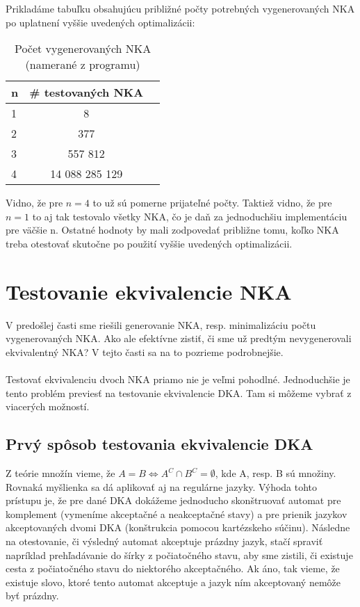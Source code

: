 Prikladáme tabuľku obsahujúcu približné počty potrebných vygenerovaných NKA po uplatnení vyššie uvedených optimalizácii:

\begin{table}[h]
  \centering
  \begin{tabular}{|l|c|r|}
    \hline
    n & \# testovaných NKA \\
    \hline
    1 & 8 \\ 
    \hline
    2 & 377 \\ 
    \hline
    3 & 557 812 \\
    \hline
    4 & 14 088 285 129 \\
    \hline
  \end{tabular}
  
  \caption{Počet vygenerovaných NKA (namerané z programu)}
  
  \label{tab:pocVsNKA}
\end{table}
Vidno, že pre $n=4$ to už sú pomerne prijateľné počty. Taktiež vidno, že pre $n=1$ to aj tak testovalo všetky NKA, čo je daň za jednoduchšiu implementáciu pre väčšie n. Ostatné hodnoty by mali zodpovedať približne tomu, koľko NKA treba otestovať skutočne po použití vyššie uvedených optimalizácii.

\section{Testovanie ekvivalencie NKA}
V predošlej časti sme riešili generovanie NKA, resp. minimalizáciu počtu vygenerovaných NKA. Ako ale efektívne zistiť, či sme už predtým nevygenerovali ekvivalentný NKA? V tejto časti sa na to pozrieme podrobnejšie.

\paragraph{}
Testovať ekvivalenciu dvoch NKA priamo nie je veľmi pohodlné. Jednoduchšie je tento problém previesť na testovanie ekvivalencie DKA. Tam si môžeme vybrať z viacerých možností.

\subsection{Prvý spôsob testovania ekvivalencie DKA}
Z teórie množín vieme, že $A = B \Longleftrightarrow A^C \cap B^C = \emptyset$, kde A, resp. B sú množiny. Rovnaká myšlienka sa dá aplikovať aj na regulárne jazyky. Výhoda tohto prístupu je, že pre dané DKA dokážeme jednoducho skonštruovať automat pre komplement (vymeníme akceptačné a neakceptačné stavy) a pre prienik jazykov akceptovaných dvomi DKA (konštrukcia pomocou kartézskeho súčinu). Následne na otestovanie, či výsledný automat akceptuje prázdny jazyk, stačí spraviť napríklad prehľadávanie do šírky z počiatočného stavu, aby sme zistili, či existuje cesta z počiatočného stavu do niektorého akceptačného. Ak áno, tak vieme, že existuje slovo, ktoré tento automat akceptuje a jazyk ním akceptovaný nemôže byť prázdny.

